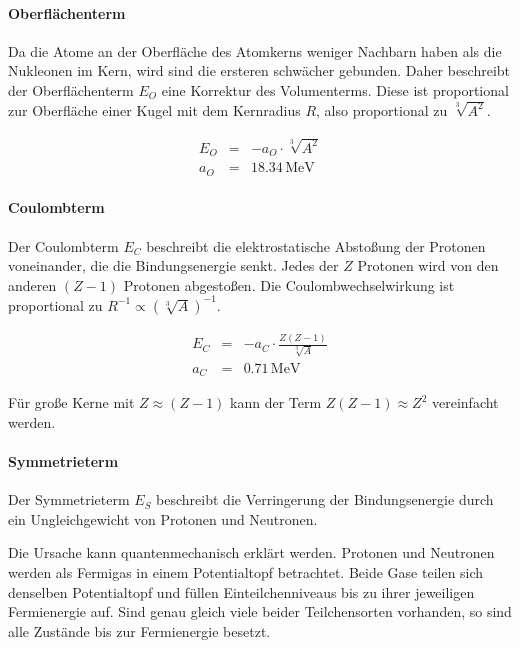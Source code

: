 \documentclass[12pt,a4paper]{scrartcl}
\numberwithin{equation}{section} %
\begin{document}
\hypertarget{oberfluxe4chenterm}{%
	\paragraph{Oberflächenterm}\label{oberfluxe4chenterm}}

Da die Atome an der Oberfläche des Atomkerns weniger Nachbarn haben als die Nukleonen im Kern, wird sind die ersteren schwächer gebunden. Daher beschreibt der Oberflächenterm $E_O$ eine Korrektur des Volumenterms. Diese ist proportional zur Oberfläche einer Kugel mit dem Kernradius $R$, also proportional zu $\sqrt[3]{A^2}$.

\begin{eqnarray}
	E_O &=& - a_O\cdot \sqrt[3]{A^2} \label{Oberflächenterm} \\
	a_O &=& 18.34\mathrm{\,MeV}
\end{eqnarray}

\hypertarget{coulombterm}{%
	\paragraph{Coulombterm}\label{coulombterm}}

Der Coulombterm $E_C$ beschreibt die elektrostatische Abstoßung der Protonen voneinander, die die Bindungsenergie senkt. Jedes der $Z$ Protonen wird von den anderen $(Z-1)$ Protonen abgestoßen. Die Coulombwechselwirkung ist proportional zu $R^{-1}\propto\left(\sqrt[3]{A}\right)^{-1}$.

\begin{eqnarray}
	E_C &=& - a_C\cdot \frac{Z(Z-1)}{\sqrt[3]{A}} \label{Coulombterm} \\
	a_C &=& 0.71\mathrm{\,MeV}
\end{eqnarray}

\noindent
Für große Kerne mit $Z\approx(Z-1)$ kann der Term $Z(Z-1)\approx Z^2$ vereinfacht werden.

\hypertarget{symmetrieterm}{%
	\paragraph{Symmetrieterm}\label{symmetrieterm}}

Der Symmetrieterm $E_S$ beschreibt die Verringerung der Bindungsenergie durch ein Ungleichgewicht von Protonen und Neutronen.

Die Ursache kann quantenmechanisch erklärt werden. Protonen und Neutronen werden als Fermigas in einem Potentialtopf betrachtet. Beide Gase teilen sich denselben Potentialtopf und füllen Einteilchenniveaus bis zu ihrer jeweiligen Fermienergie auf. Sind genau gleich viele beider Teilchensorten vorhanden, so sind alle Zustände bis zur Fermienergie besetzt.
\end{document}
